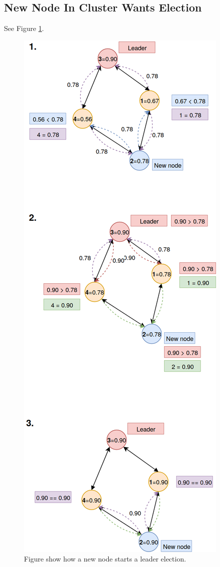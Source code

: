 \documentclass[USenglish]{uit-thesis}
\begin{document}
\subsection{New Node In Cluster Wants Election}
See Figure \ref{fig:newNodeLeaderElection}.

\begin{figure}
\centering
\includegraphics[scale=0.3]{newNodeLeaderElection.png}
\caption{Figure show how a new node starts a leader election.}
\label{fig:newNodeLeaderElection}
\end{figure}
\end{document}
